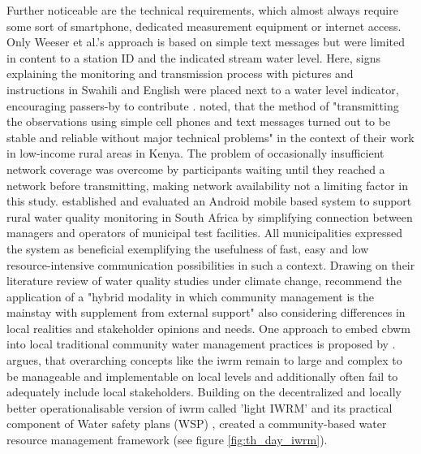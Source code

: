 Further noticeable are the technical requirements, which almost always require some sort of smartphone, dedicated measurement equipment or internet access. Only Weeser et al.'s approach is based on simple text messages but were limited in content to a station ID and the indicated stream water level. Here, signs explaining the monitoring and transmission process with pictures and instructions in Swahili and English were placed next to a water level indicator, encouraging passers-by to contribute \autocite{weeserCitizenSciencePioneers2018a}. \autocite[1597]{weeserCitizenSciencePioneers2018a} noted, that the method of "transmitting the observations using simple cell phones and text messages turned out to be stable and reliable without major technical problems" in the context of their work in low-income rural areas in Kenya. The problem of occasionally insufficient network coverage was overcome by participants waiting until they reached a network before transmitting, making network availability not a limiting factor in this study. \autocite{wilson-jonesUsingMobilePhones2012} established and evaluated an Android mobile based system to support rural water quality monitoring in South Africa by simplifying connection between managers and operators of municipal test facilities. All municipalities expressed the system as beneficial exemplifying the usefulness of fast, easy and low resource-intensive communication possibilities in such a context.\newline
Drawing on their literature review of water quality studies under climate change, \autocite[147]{huangManagementDrinkingWater2020} recommend the application of a "hybrid modality in which community management is the mainstay with supplement from external support" also considering differences in local realities and stakeholder opinions and needs. One approach to embed \acrshort{cbwm} into local traditional community water management practices is proposed by \autocite{dayCommunitybasedWaterResources2009}. \autocite{dayCommunitybasedWaterResources2009} argues, that overarching concepts like the \acrfull{iwrm} remain to large and complex to be manageable and implementable on local levels and additionally often fail to adequately include local stakeholders. Building on the decentralized and locally better operationalisable version of \acrshort{iwrm} called 'light IWRM' \autocite{butterworthFindingPracticalApproaches2010,moriartyIntegratedWaterResources2004} and its practical component of Water safety plans (WSP) \autocite{bartramWaterSafetyPlan2009}, \autocite{dayCommunitybasedWaterResources2009} created a community-based water resource management framework (see figure \ref{fig:th_day_iwrm}). 

